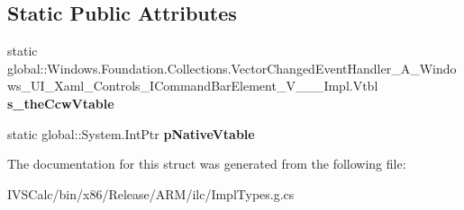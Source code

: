 \subsection*{Static Public Attributes}
\begin{DoxyCompactItemize}
\item 
\mbox{\label{struct_windows_1_1_foundation_1_1_collections_1_1_vector_changed_event_handler___a___windows___ud3b80c77359cead1f814fa39c92b857f_af06bdf860cb0ef27787de5c6de1747c2}} 
static global\+::\+Windows.\+Foundation.\+Collections.\+Vector\+Changed\+Event\+Handler\+\_\+\+A\+\_\+\+Windows\+\_\+\+U\+I\+\_\+\+Xaml\+\_\+\+Controls\+\_\+\+I\+Command\+Bar\+Element\+\_\+\+V\+\_\+\+\_\+\+\_\+\+Impl.\+Vtbl {\bfseries s\+\_\+the\+Ccw\+Vtable}
\item 
\mbox{\label{struct_windows_1_1_foundation_1_1_collections_1_1_vector_changed_event_handler___a___windows___ud3b80c77359cead1f814fa39c92b857f_a7c0d902ddf5490102c031478619fa0cd}} 
static global\+::\+System.\+Int\+Ptr {\bfseries p\+Native\+Vtable}
\end{DoxyCompactItemize}


The documentation for this struct was generated from the following file\+:\begin{DoxyCompactItemize}
\item 
I\+V\+S\+Calc/bin/x86/\+Release/\+A\+R\+M/ilc/Impl\+Types.\+g.\+cs\end{DoxyCompactItemize}
